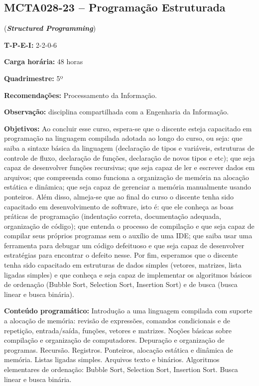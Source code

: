 \documentclass[class=article, crop=false]{standalone}
\begin{document}
\subsection{MCTA028-23 -- Programação Estruturada}
\label{disc:pe}

(\textbf{\textit{Structured Programming}})

\begin{center}
    \begin{minipage}{0.85\textwidth}
        \textbf{T-P-E-I:} 2-2-0-6
        
        \textbf{Carga horária:} 48 horas
        
        \textbf{Quadrimestre:} 5º
        
        \textbf{Recomendações:} 
        Processamento da Informação.
        
        \textbf{Observação:} disciplina compartilhada com a Engenharia da Informação.
    \end{minipage}
\end{center}

\textbf{Objetivos:}
Ao concluir esse curso, espera-se que o discente esteja capacitado em
programação na linguagem compilada adotada ao longo do curso, ou seja: que
saiba a sintaxe básica da linguagem (declaração de tipos e variáveis,
estruturas de controle de fluxo, declaração de funções, declaração de novos
tipos e etc); que seja capaz de desenvolver funções recursivas; que seja capaz
de ler e escrever dados em arquivos; que compreenda como funciona a organização
de memória na alocação estática e dinâmica; que seja capaz de gerenciar a
memória manualmente usando ponteiros. 
Além disso, almeja-se que ao final do curso o discente tenha sido capacitado em
desenvolvimento de software, isto é: que ele conheça as boas práticas de
programação (indentação correta, documentação adequada, organização de código);
que entenda o processo de compilação e que seja capaz de compilar seus próprios
programas sem o auxílio de uma IDE; que saiba usar uma ferramenta para debugar
um código defeituoso e que seja capaz de desenvolver estratégias para encontrar
o defeito nesse.
Por fim, esperamos que o discente tenha sido capacitado em estruturas de dados
simples (vetores, matrizes, lista ligadas simples) e que conheça e seja capaz
de implementar os algoritmos básicos de ordenação (Bubble Sort, Selection Sort,
Insertion Sort) e de busca (busca linear e busca binária).

\textbf{Conteúdo programático:}
Introdução a uma linguagem compilada com suporte a alocação de memória: revisão 
de expressões, comandos condicionais e de repetição, entrada/saída, funções, 
vetores e matrizes.
Noções básicas sobre compilação e organização de computadores.
Depuração e organização de programas.
Recursão.
Registros.
Ponteiros, alocação estática e dinâmica de memória.
Listas ligadas simples.
Arquivos texto e binários.
Algoritmos elementares de ordenação: Bubble Sort, Selection Sort, Insertion Sort.
Busca linear e busca binária.
\end{document}
